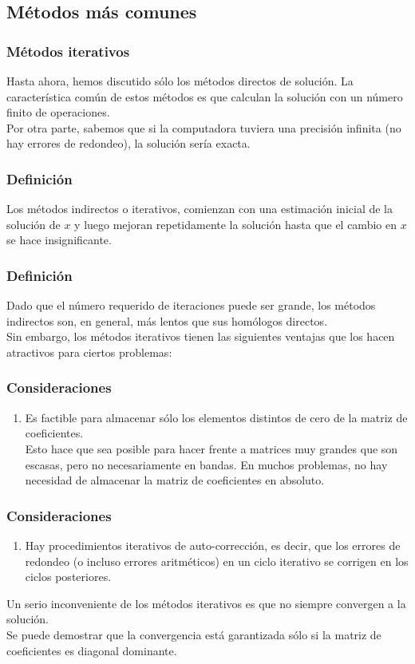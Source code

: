 \subsection{Métodos más comunes}
\begin{frame}
\frametitle{Métodos iterativos}
Hasta ahora, hemos discutido sólo los métodos directos de solución. La característica común de estos métodos es que calculan la solución con un número finito de operaciones.
\\
\medskip
Por otra parte, sabemos que si la computadora tuviera una precisión infinita (no hay errores de redondeo), la solución sería exacta.
\end{frame}
\begin{frame}
\frametitle{Definición}
Los métodos indirectos o iterativos, comienzan con una estimación inicial de la solución de $x$ y luego mejoran repetidamente la solución hasta que el cambio en $x$ se hace insignificante.
\end{frame}
\begin{frame}
\frametitle{Definición}
Dado que el número requerido de iteraciones puede ser grande, los métodos indirectos son, en general, más lentos que sus homólogos directos. 
\\
\bigskip
Sin embargo, los métodos iterativos tienen las siguientes ventajas que los hacen atractivos para ciertos problemas:
\end{frame}
\begin{frame}
\frametitle{Consideraciones}
\begin{enumerate}
\item Es factible para almacenar sólo los elementos distintos de cero de la matriz de coeficientes. 
\\
\bigskip
Esto hace que sea posible para hacer frente a matrices muy grandes que son escasas, pero no necesariamente en bandas. En muchos problemas, no hay necesidad de almacenar la matriz de coeficientes en absoluto.
\seti
\end{enumerate}
\end{frame}
\begin{frame}
\frametitle{Consideraciones}
\begin{enumerate}
\conti
\item Hay procedimientos iterativos de auto-corrección, es decir, que los errores de redondeo (o incluso errores aritméticos) en un ciclo iterativo se corrigen en los ciclos posteriores.
\end{enumerate}
\end{frame}
\begin{frame}
Un serio inconveniente de los métodos iterativos es que no siempre convergen a la solución.
\\
\bigskip
Se puede demostrar que la convergencia está garantizada sólo si la matriz de coeficientes es diagonal dominante.
\end{frame}
